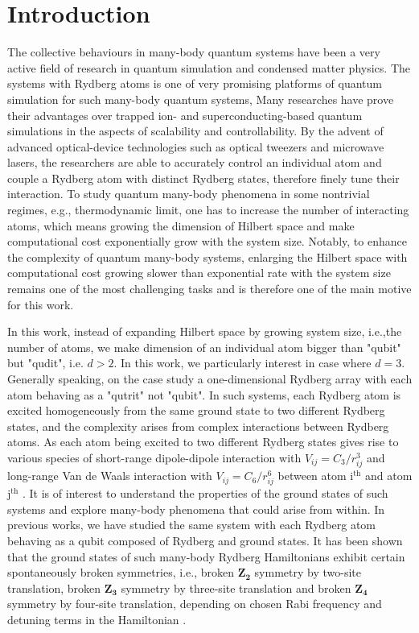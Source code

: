 \documentclass[%
 reprint,
nofootinbib,
 amsmath,amssymb,
 aps,
pra,
floatfix,
]{revtex4-2}
\begin{document}
\section{Introduction}
The collective behaviours in many-body quantum systems have been a very active field of research in quantum simulation and condensed matter physics. The systems with Rydberg atoms is one of very promising platforms of quantum simulation for such many-body quantum systems, Many researches have prove their advantages over trapped ion- and superconducting-based quantum simulations in the aspects of scalability and controllability. By the advent of advanced optical-device technologies such as optical tweezers and microwave lasers, the researchers are able to accurately control an individual atom and couple a Rydberg atom with distinct Rydberg states, therefore finely tune their interaction. To study quantum many-body phenomena in some nontrivial regimes, e.g., thermodynamic limit, one has to increase the number of interacting atoms, which means growing the dimension of Hilbert space and make computational cost exponentially grow with the system size. Notably, to enhance the complexity of quantum many-body systems, enlarging the Hilbert space with computational cost growing slower than exponential rate with the system size remains one of the most challenging tasks and is therefore one of the main motive for this work.

In this work, instead of expanding Hilbert space by growing system size, i.e.,the number of atoms, we make dimension of an individual atom bigger than "qubit" but "qudit", i.e. $d>2$. In this work, we particularly interest in case where $d=3$. Generally speaking, on the case study a one-dimensional Rydberg array with each atom behaving as a "qutrit" not "qubit". In such systems, each Rydberg atom is excited homogeneously from the same ground state to two different Rydberg states, and the complexity arises from complex interactions between Rydberg atoms. As each atom being excited to two different Rydberg states gives rise to various species of short-range dipole-dipole interaction with $V_{ij} = C_3/r^3_{ij}$  and long-range Van de Waals interaction with $V_{ij} = C_6/r^6_{ij}$ between atom $\text{i}^{\text{th}}$ and atom $\text{j}^{\text{th}}$ \cite{Saffman2010QuantumAtoms}. It is of interest to understand the properties of the ground states of such systems and explore many-body phenomena that could arise from within. In previous works, we have studied the same system with each Rydberg atom behaving as a qubit composed of Rydberg and ground states. It has been shown that the ground states of such many-body Rydberg Hamiltonians exhibit certain spontaneously broken symmetries, i.e., broken $\mathbf{Z_2}$ symmetry by two-site translation, broken $\mathbf{Z_3}$ symmetry by three-site translation and broken $\mathbf{Z_4}$ symmetry by four-site translation, depending on chosen Rabi frequency and detuning terms in the Hamiltonian \cite{Bernien2017ProbingSimulator,Keesling2019QuantumSimulator}. 
\end{document}
